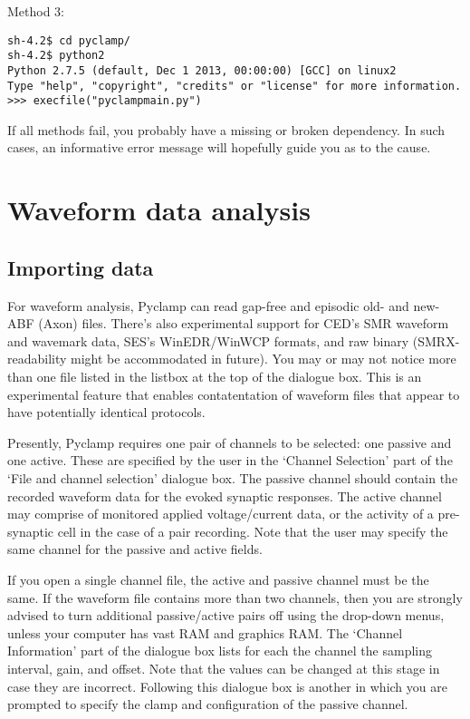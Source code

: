 \documentclass{article}
\begin{document}
Method 3:

\begin{verbatim}
sh-4.2$ cd pyclamp/
sh-4.2$ python2
Python 2.7.5 (default, Dec 1 2013, 00:00:00) [GCC] on linux2
Type "help", "copyright", "credits" or "license" for more information.
>>> execfile("pyclampmain.py") 
\end{verbatim}

If all methods fail, you probably have a missing or broken dependency. In such cases, an informative error message will
hopefully guide you as to the cause.

\section{Waveform data analysis}

\subsection{Importing data}

For waveform analysis, Pyclamp can read gap-free and episodic old- and new- ABF (Axon) files. There's also experimental
support for CED's SMR waveform and wavemark data, SES's WinEDR/WinWCP formats, and raw binary (SMRX-readability might be
accommodated in future).  You may or may not notice more than one file listed in the listbox at the top of the dialogue
box. This is an experimental feature that enables contatentation of waveform files that appear to have potentially
identical protocols.

Presently, Pyclamp requires one pair of channels to be selected: one passive and one active.
These are specified by the user in the `Channel Selection' part of the `File and channel selection' dialogue box. The
passive channel should contain the recorded waveform data for the evoked synaptic responses. The active channel may
comprise of monitored applied voltage/current data, or the activity of a pre-synaptic cell in the case of a pair
recording. Note that the user may specify the same channel for the passive and active fields.

If you open a single channel file, the active and passive channel must be the same. If the waveform file contains more
than two channels, then you are strongly advised to turn additional passive/active pairs off using the drop-down menus,
unless your computer has vast RAM and graphics RAM. The `Channel Information' part of the dialogue box lists for each
the channel the sampling interval, gain, and offset. Note that the values can be changed at this stage in case they are
incorrect.  Following this dialogue box is another in which you are prompted to specify the clamp and configuration of
the passive channel.
\end{document}
